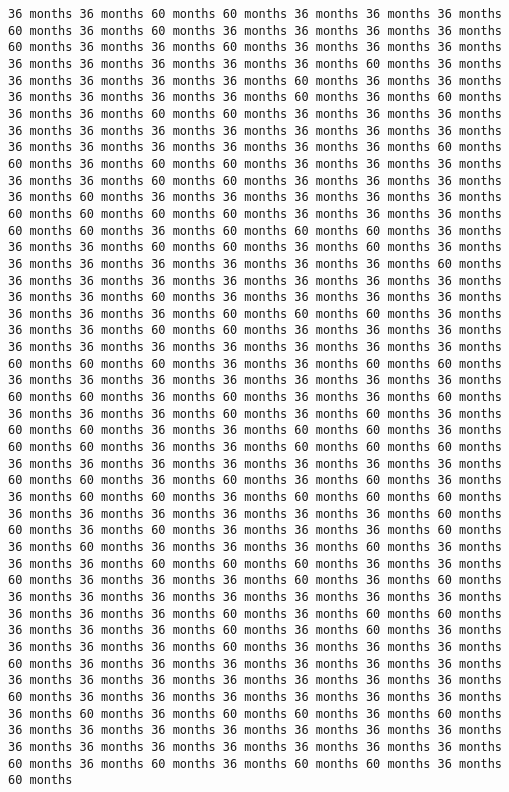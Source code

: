 \documentclass[11pt]{article}
\begin{document}
\begin{Verbatim}[commandchars=\\\{\}, frame=single, framerule=2mm, rulecolor=\color{outerrorbackground}]
36 months 36 months 60 months 60 months 36 months 36 months 36 months 60 months 36 months 60 months 36 months 36 months 36 months 36 months 60 months 36 months 36 months 60 months 36 months 36 months 36 months 36 months 36 months 36 months 36 months 36 months 60 months 36 months 36 months 36 months 36 months 36 months 60 months 36 months 36 months 36 months 36 months 36 months 36 months 60 months 36 months 60 months 36 months 36 months 60 months 60 months 36 months 36 months 36 months 36 months 36 months 36 months 36 months 36 months 36 months 36 months 36 months 36 months 36 months 36 months 36 months 36 months 60 months 60 months 36 months 60 months 60 months 36 months 36 months 36 months 36 months 36 months 60 months 60 months 36 months 36 months 36 months 36 months 60 months 36 months 36 months 36 months 36 months 36 months 60 months 60 months 60 months 60 months 36 months 36 months 36 months 60 months 60 months 36 months 60 months 60 months 60 months 36 months 36 months 36 months 60 months 60 months 36 months 60 months 36 months 36 months 36 months 36 months 36 months 36 months 36 months 60 months 36 months 36 months 36 months 36 months 36 months 36 months 36 months 36 months 36 months 60 months 36 months 36 months 36 months 36 months 36 months 36 months 36 months 60 months 60 months 60 months 36 months 36 months 36 months 60 months 60 months 36 months 36 months 36 months 36 months 36 months 36 months 36 months 36 months 36 months 36 months 60 months 60 months 60 months 36 months 36 months 60 months 60 months 36 months 36 months 36 months 36 months 36 months 36 months 36 months 60 months 60 months 36 months 60 months 36 months 36 months 60 months 36 months 36 months 36 months 60 months 36 months 60 months 36 months 60 months 60 months 36 months 36 months 60 months 60 months 36 months 60 months 60 months 36 months 36 months 60 months 60 months 60 months 36 months 36 months 36 months 36 months 36 months 36 months 36 months 60 months 60 months 36 months 60 months 36 months 60 months 36 months 36 months 60 months 60 months 36 months 60 months 60 months 60 months 36 months 36 months 36 months 36 months 36 months 36 months 60 months 60 months 36 months 60 months 36 months 36 months 36 months 60 months 36 months 60 months 36 months 36 months 36 months 60 months 36 months 36 months 36 months 60 months 60 months 60 months 36 months 36 months 60 months 36 months 36 months 36 months 60 months 36 months 60 months 36 months 36 months 36 months 36 months 36 months 36 months 36 months 36 months 36 months 36 months 60 months 36 months 60 months 60 months 36 months 36 months 36 months 60 months 36 months 60 months 36 months 36 months 36 months 36 months 60 months 36 months 36 months 36 months 60 months 36 months 36 months 36 months 36 months 36 months 36 months 36 months 36 months 36 months 36 months 36 months 36 months 36 months 60 months 36 months 36 months 36 months 36 months 36 months 36 months 36 months 60 months 36 months 60 months 60 months 36 months 60 months 36 months 36 months 36 months 36 months 36 months 36 months 36 months 36 months 36 months 36 months 36 months 36 months 36 months 36 months 60 months 36 months 60 months 36 months 60 months 60 months 36 months 60 months 
\end{Verbatim}
\end{document}
